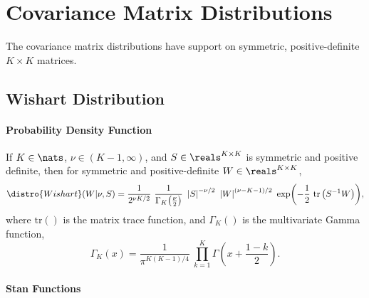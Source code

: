 \begin{description}
%
%
\end{description}
\begin{description}
\end{description}




\chapter{Covariance Matrix Distributions}

\noindent
The covariance matrix distributions have support on symmetric,
positive-definite $K \times K$ matrices.


\section{Wishart Distribution}

\subsubsection{Probability Density Function}

If $K \in \nats$, $\nu \in (K-1,\infty)$, and $S \in \reals^{K \times K}$ is symmetric
and positive definite, then for symmetric and positive-definite $W \in
\reals^{K \times K}$,
\[
\distro{Wishart}(W|\nu,S)
=
\frac{1}{2^{\nu K / 2}}
\
\frac{1}{\Gamma_K \! \left( \frac{\nu}{2} \right)}
\
\left| S \right|^{-\nu/2}
\
\left| W \right|^{(\nu - K - 1)/2}
\
\exp \! \left(- \frac{1}{2} \ \mbox{tr}\left( S^{-1} W \right) \right)
\! ,
\]
%
where $\mbox{tr}()$ is the matrix trace function, and $\Gamma_K()$ is
the multivariate Gamma function,
\[
\Gamma_K(x) = 
\frac{1}{\pi^{K(K-1)/4}}
\
\prod_{k=1}^K \Gamma \left( x + \frac{1 - k}{2} \right)
\!.
\]


\subsubsection{Stan Functions}

